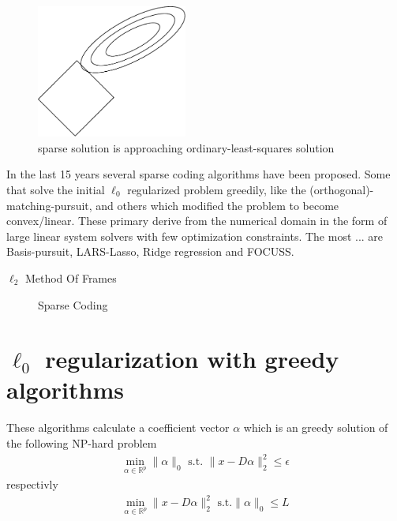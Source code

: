 \begin{figure}[h]
\centering
\includegraphics[width = 0.44\textwidth]{images/regularization.pdf}
\caption{sparse solution is approaching ordinary-least-squares solution}
\label{fig:sparse}
\end{figure}


In the last 15 years several sparse coding algorithms have been proposed. Some
that solve the initial $\ell_0$ regularized problem greedily, like
the (orthogonal)-matching-pursuit, and others which modified the problem to
become convex/linear. These primary derive from the numerical domain in the form
of large linear system solvers with few optimization constraints. The most
... are Basis-pursuit, LARS-Lasso, Ridge regression and FOCUSS.

$\ell_2$ Method Of Frames


\begin{figure}
\centering
\caption{Sparse Coding}
\label{fig:da_x}
\end{figure}




\section{$\ell_0$ regularization with greedy algorithms}
These algorithms calculate a coefficient vector $\alpha$ which is an
greedy solution of the following NP-hard problem
\begin{align}
\min_{\alpha\in\mathbb{R}^{p}}   \lVert \alpha \rVert_{0}   \textrm{ s.t. } \lVert x - D\alpha \rVert^{2}_{2} \leq \epsilon
\end{align}
respectivly
\begin{align}
\min_{\alpha\in\mathbb{R}^{p}}  \lVert x - D\alpha \rVert^{2}_{2} \textrm{ s.t.
} \lVert \alpha \rVert_{0} \leq L
\end{align}
\cite{Mallat1993}

